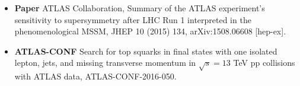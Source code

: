 \begin{cventries}
\begin{itemize}
	\item \textbf{Paper }ATLAS Collaboration, Summary of the ATLAS experiment's sensitivity to supersymmetry after LHC Run 1 interpreted in the phenomenological MSSM, JHEP 10 (2015) 134, arXiv:1508.06608 [hep-ex].
	
	\item \textbf{ATLAS-CONF} Search for top squarks in final states with one isolated lepton, jets, and missing transverse momentum in $\sqrt{s} = 13$ TeV pp collisions with ATLAS data, ATLAS-CONF-2016-050.
\end{itemize}

\end{cventries}

